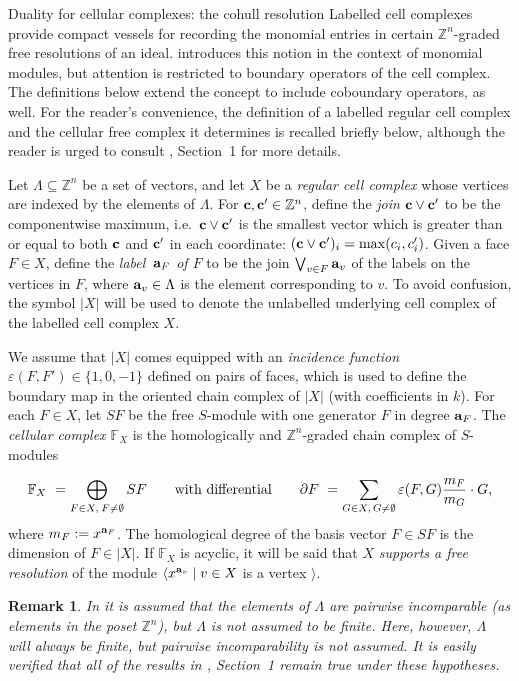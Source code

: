 \documentclass[12pt,leqno]{article}
\newtheorem{remark}[thm]{Remark}
\def\<{{\langle}}
\def\>{{\rangle}}
\def\aa{{{\rm \bf a}}}
\def\cc{{{\rm \bf c}}}
\def\FF{{\mathbb F}}
\def\ZZ{{\mathbb Z}}
\begin{document}
\begin{section}{Duality for cellular complexes: the cohull resolution}
Labelled cell complexes provide compact vessels for recording the
monomial entries in certain $\ZZ^n$-graded free resolutions of an ideal.
\cite{BS} introduces this notion in the context of monomial modules, but
attention is restricted to boundary operators of the cell complex.  The
definitions below extend the concept to include coboundary operators, as
well.  For the reader's convenience, the definition of a labelled regular
cell complex and the cellular free complex it determines is recalled
briefly below, although the reader is urged to consult \cite{BS},
Section~1 for more details.

Let $\Lambda \subseteq \ZZ^n$ be a set of vectors, and let $X$ be a {\it
regular cell complex} whose vertices are indexed by the elements of
$\Lambda$.  For $\cc,\cc' \in \ZZ^n$, define the {\it join $\cc \vee
\cc'$} to be the componentwise maximum, i.e.\ $\cc \vee \cc'$ is the
smallest vector which is greater than or equal to both $\cc$ and $\cc'$
in each coordinate: $(\cc \vee \cc')_i = \max(c_i,c_i')$.  Given a face
$F \in X$, define the {\it label\, $\aa_F$ of $F$} to be the join
$\bigvee_{v \in F} \aa_v$ of the labels on the vertices in $F$, where
$\aa_v \in \Lambda$ is the element corresponding to $v$.  To avoid
confusion, the symbol $|X|$ will be used to denote the unlabelled
underlying cell complex of the labelled cell complex $X$.

We assume that $|X|$ comes equipped with an {\it incidence function}
$\varepsilon(F,F') \in \{1,0,-1\}$ defined on pairs of faces, which is
used to define the boundary map in the oriented chain complex of $|X|$
(with coefficients in $k$).  For each $F \in X$, let $SF$ be the free
$S$-module with one generator $F$ in degree $\aa_F$.  The {\it cellular
complex $\FF_X$} is the homologically and $\ZZ^n$-graded chain complex of
$S$-modules 

$$
  \FF_X \ = \bigoplus_{F \in X,\: F \neq \emptyset}SF
  \qquad {\rm with\ differential} \qquad
  \partial F \ = \sum_{G \in X,\,G \neq \emptyset}
		\varepsilon(F,G){m_F \over m_G} \cdot G,
$$
where $m_F := x^{\aa_F}$.  The homological degree of the basis vector $F
\in SF$ is the dimension of $F \in |X|$.  If $\FF_X$ is acyclic, it will
be said that $X$ {\it supports a free resolution} of the module
$\<x^{\aa_v} \mid v \in X$ is a vertex $\>$.

\noindent
\begin{remark} \rm
In \cite{BS} it is assumed that the elements of $\Lambda$ are pairwise
incomparable (as elements in the poset $\ZZ^n$), but $\Lambda$ is not
assumed to be finite.  Here, however, $\Lambda$ will always be finite,
but pairwise incomparability is not assumed.  It is easily verified that
all of the results in \cite{BS}, Section~1 remain true under these
hypotheses.
\end{remark}


\end{section}
\end{document}
